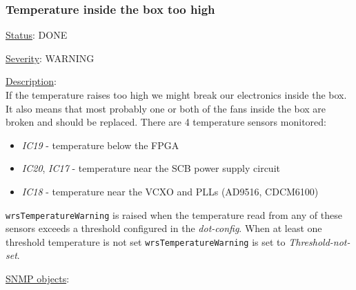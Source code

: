 \subsubsection{\bf Temperature inside the box too high}
		\label{fail:other:temp}
		\begin{packed_enum}
			\item [] \underline{Status}: DONE
			\item [] \underline{Severity}: WARNING
			\item [] \underline{Description}:\\
				If the temperature raises too high we might break our electronics inside
				the box. It also means that most probably one or both of the fans inside
				the box are broken and should be replaced. There are 4 temperature
				sensors monitored:
				\begin{itemize}
					\item \emph{IC19} - temperature below the FPGA
					\item \emph{IC20}, \emph{IC17} - temperature near the SCB power supply
						circuit
					\item \emph{IC18} - temperature near the VCXO and PLLs (AD9516,
						CDCM6100)
				\end{itemize}
				\texttt{wrsTemperatureWarning} is raised when the temperature read from
				any of these sensors exceeds a threshold configured in the
				\emph{dot-config}. When at least one threshold temperature is not set
				\texttt{wrsTemperatureWarning} is set to \emph{Threshold-not-set}.
			\item [] \underline{SNMP objects}:\\
				\\
				\\
				\\
				\\
				\\
				\\
				\\
				\\
		\end{packed_enum}

